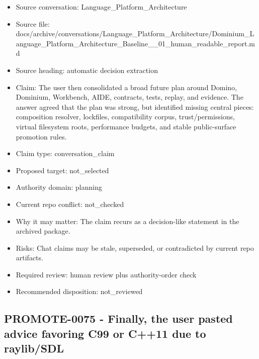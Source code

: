 \documentclass[11pt,a4paper]{report}
\begin{document}
\begin{itemize}
\item Source conversation: Language\_Platform\_Architecture
\item Source file: docs/archive/conversations/Language\_Platform\_Architecture/Dominium\_Language\_Platform\_Architecture\_Baseline\_\_01\_human\_readable\_report.md
\item Source heading: automatic decision extraction
\item Claim: The user then consolidated a broad future plan around Domino, Dominium, Workbench, AIDE, contracts, tests, replay, and evidence. The answer agreed that the plan was strong, but identified missing central pieces: composition resolver, lockfiles, compatibility corpus, trust/permissions, virtual filesystem roots, performance budgets, and stable public-surface promotion rules.
\item Claim type: conversation\_claim
\item Proposed target: not\_selected
\item Authority domain: planning
\item Current repo conflict: not\_checked
\item Why it may matter: The claim recurs as a decision-like statement in the archived package.
\item Risks: Chat claims may be stale, superseded, or contradicted by current repo artifacts.
\item Required review: human review plus authority-order check
\item Recommended disposition: not\_reviewed
\end{itemize}

\subsection{PROMOTE-0075 - Finally, the user pasted advice favoring C99 or C++11 due to raylib/SDL}
\end{document}
